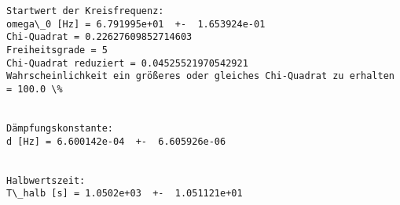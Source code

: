 \documentclass[10pt]{report}
\begin{document}
    \begin{Verbatim}[commandchars=\\\{\}, fontsize=\scriptsize]
Startwert der Kreisfrequenz: 
omega\_0 [Hz] = 6.791995e+01  +-  1.653924e-01
Chi-Quadrat = 0.22627609852714603
Freiheitsgrade = 5
Chi-Quadrat reduziert = 0.04525521970542921
Wahrscheinlichkeit ein größeres oder gleiches Chi-Quadrat zu erhalten = 100.0 \%


Dämpfungskonstante: 
d [Hz] = 6.600142e-04  +-  6.605926e-06


Halbwertszeit: 
T\_halb [s] = 1.0502e+03  +-  1.051121e+01

    \end{Verbatim}

    \begin{center}
    \end{center}
    { \hspace*{\fill} \\}
    
\end{document}
